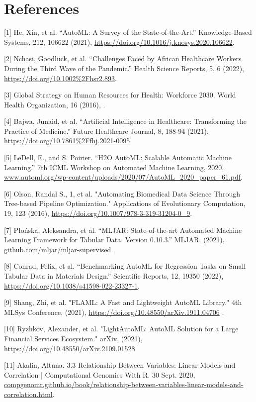 \documentclass{article}
\begin{document}
\section*{References}

\medskip
{
\small

[1] He, Xin, et al. “AutoML: A Survey of the State-of-the-Art.” Knowledge-Based Systems, 212, 106622 (2021), \url{https://doi.org/10.1016/j.knosys.2020.106622}. 

[2] Nchasi, Goodluck, et al. “Challenges Faced by African Healthcare Workers During the Third Wave of the Pandemic.” Health Science Reports, 5, 6 (2022), \url{https://doi.org/10.1002%2Fhsr2.893}.

[3] Global Strategy on Human Resources for Health: Workforce 2030. World Health Organization, 16 (2016), \url{}.

[4] Bajwa, Junaid, et al. “Artificial Intelligence in Healthcare: Transforming the Practice of Medicine.” Future Healthcare Journal, 8, 188-94 (2021), \url{https://doi.org/10.7861%2Ffhj.2021-0095} 

[5] LeDell, E., and S. Poirier. “H2O AutoML: Scalable Automatic Machine Learning.” 7th ICML Workshop on Automated Machine Learning, 2020, \url{www.automl.org/wp-content/uploads/2020/07/AutoML_2020_paper_61.pdf}.

[6] Olson, Randal S., 1, et al. "Automating Biomedical Data Science Through Tree-based Pipeline Optimization." Applications of Evolutionary Computation, 19, 123 (2016), \url{https://doi.org/10.1007/978-3-319-31204-0_9}.

[7] P\l{}o\'{n}ska, Aleksandra, et al. “MLJAR: State-of-the-art Automated Machine Learning Framework for Tabular Data.  Version 0.10.3.” MLJAR, (2021), \url{github.com/mljar/mljar-supervised}.

[8] Conrad, Felix, et al. “Benchmarking AutoML for Regression Tasks on Small Tabular Data in Materials Design.” Scientific Reports, 12, 19350 (2022), \url{https://doi.org/10.1038/s41598-022-23327-1}.

[9] Shang, Zhi, et al. "FLAML: A Fast and Lightweight AutoML Library." 4th MLSys Conference, (2021), \url{https://doi.org/10.48550/arXiv.1911.04706} .

[10] Ryzhkov, Alexander, et al. "LightAutoML: AutoML Solution for a Large Financial Services Ecosystem." arXiv, (2021), \url{https://doi.org/10.48550/arXiv.2109.01528}

[11] Akalin, Altuna. 3.3 Relationship Between Variables: Linear Models and Correlation | Computational Genomics With R. 30 Sept. 2020, \url{compgenomr.github.io/book/relationship-between-variables-linear-models-and-correlation.html}.

}
\end{document}
